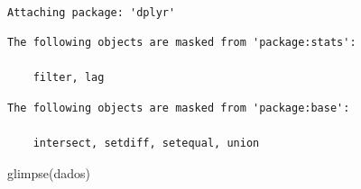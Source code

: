 \documentclass[
  letterpaper,
  DIV=11,
  numbers=noendperiod]{scrreprt}
\newenvironment{Shaded}{\begin{snugshade}}{\end{snugshade}}
\newcommand{\FunctionTok}[1]{\textcolor[rgb]{0.28,0.35,0.67}{#1}}
\newcommand{\NormalTok}[1]{\textcolor[rgb]{0.00,0.23,0.31}{#1}}
\begin{document}
\begin{verbatim}

Attaching package: 'dplyr'
\end{verbatim}

\begin{verbatim}
The following objects are masked from 'package:stats':

    filter, lag
\end{verbatim}

\begin{verbatim}
The following objects are masked from 'package:base':

    intersect, setdiff, setequal, union
\end{verbatim}

\begin{Shaded}
\begin{Highlighting}[]
\FunctionTok{glimpse}\NormalTok{(dados)}
\end{Highlighting}
\end{Shaded}
\end{document}
